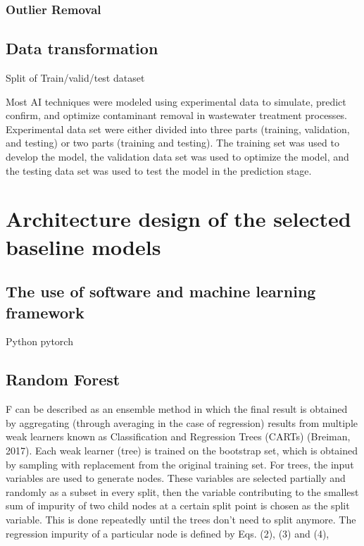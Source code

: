 \subsubsection{Outlier Removal}

\subsection{Data transformation}
Split of Train/valid/test dataset 



Most AI techniques were modeled using experimental data to simulate, predict confirm, and optimize contaminant removal in wastewater treatment processes. Experimental data set were either divided into three parts (training, validation, and testing) or two parts (training and testing). The training set was used to develop the model, the validation data set was used to optimize the model, and the testing data set was used to test the model in the prediction stage.

\section{Architecture design of the selected baseline models}
\subsection{The use of software and machine learning framework}
Python
pytorch
\subsection{Random Forest}
F can be described as an ensemble method in which the final result is obtained by aggregating (through averaging in the case of regression) results from multiple weak learners known as Classification and Regression Trees (CARTs) (Breiman, 2017). Each weak learner (tree) is trained on the bootstrap set, which is obtained by sampling with replacement from the original training set. For trees, the input variables are used to generate nodes. These variables are selected partially and randomly as a subset in every split, then the variable contributing to the smallest sum of impurity of two child nodes at a certain split point is chosen as the split variable. This is done repeatedly until the trees don't need to split anymore. The regression impurity of a particular node is defined by Eqs. (2), (3) and (4), \citep{wangMachineLearningFramework2021}
